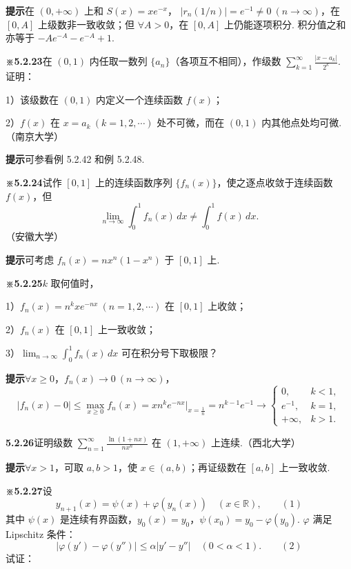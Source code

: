 \documentclass[UTF8,12pt,a4paper,fontset=fandol]{ctexart}
\begin{document}
\noindent\textbf{提示}\quad 在 $(0,+\infty)$ 上和 $S(x)=xe^{-x}$，
$|r_n(1/n)|=e^{-1}\ne0\ (n\to\infty)$，在 $[0,A]$ 上级数非一致收敛；但
$\forall A>0$，在 $[0,A]$ 上仍能逐项积分. 积分值之和亦等于 $-Ae^{-A}-e^{-A}+1$.

\noindent\textbf{※5.2.23}\quad 在 $(0,1)$ 内任取一数列 $\{a_n\}$（各项互不相同），作级数
$\displaystyle\sum_{k=1}^{\infty}\frac{|x-a_k|}{2^k}$. 证明：

1）该级数在 $(0,1)$ 内定义一个连续函数 $f(x)$；

2）$f(x)$ 在 $x=a_k\ (k=1,2,\cdots)$ 处不可微，而在 $(0,1)$ 内其他点处均可微.（南京大学）

\noindent\textbf{提示}\quad 可参看例 5.2.42 和例 5.2.48.

\noindent\textbf{※5.2.24}\quad 试作 $[0,1]$ 上的连续函数序列 $\{f_n(x)\}$，使之逐点收敛于连续函数 $f(x)$，但
\[
  \lim_{n\to\infty}\int_0^1 f_n(x)\,dx\ne\int_0^1f(x)\,dx.
\]
（安徽大学）

\noindent\textbf{提示}\quad 可考虑 $f_n(x)=nx^n(1-x^n)$ 于 $[0,1]$ 上.

\noindent\textbf{※5.2.25}\quad $k$ 取何值时，

1）$f_n(x)=n^kxe^{-nx}\ (n=1,2,\cdots)$ 在 $[0,1]$ 上收敛；

2）$f_n(x)$ 在 $[0,1]$ 上一致收敛；

3）$\displaystyle\lim_{n\to\infty}\int_0^1 f_n(x)\,dx$ 可在积分号下取极限？

\noindent\textbf{提示}\quad $\forall x\ge0$，$f_n(x)\to0\ (n\to\infty)$，
\[
  |f_n(x)-0|\le\max_{x\ge0}f_n(x)
  =xn^ke^{-nx}\bigg|_{x=\frac1n}
  =n^{k-1}e^{-1}\to
  \begin{cases}
    0,&k<1,\\
    e^{-1},&k=1,\\
    +\infty,&k>1.
  \end{cases}
\]

\noindent\textbf{5.2.26}\quad 证明级数
$\displaystyle\sum_{n=1}^{\infty}\frac{\ln(1+nx)}{nx^n}$ 在 $(1,+\infty)$ 上连续.（西北大学）

\noindent\textbf{提示}\quad $\forall x>1$，可取 $a,b>1$，使 $x\in(a,b)$；再证级数在 $[a,b]$ 上一致收敛.

\noindent\textbf{※5.2.27}\quad 设
\[
  y_{n+1}(x)=\psi(x)+\varphi(y_n(x))\quad(x\in\mathbb R),
\qquad(1)
\]
其中 $\psi(x)$ 是连续有界函数，$y_0(x)=y_0$，$\psi(x_0)=y_0-\varphi(y_0)$. $\varphi$ 满足 Lipschitz 条件：
\[
  |\varphi(y')-\varphi(y'')|\le\alpha|y'-y''|\quad(0<\alpha<1).
\qquad(2)
\]
试证：
\end{document}
